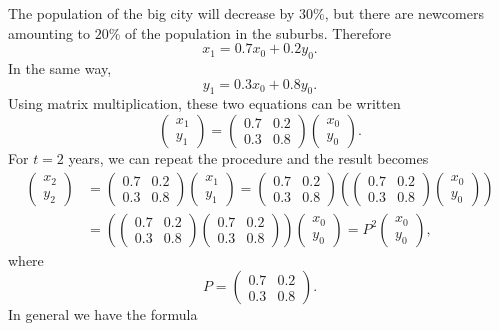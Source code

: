 \documentclass{article}
\begin{document}
\begin{example}
The population of the big city will decrease by $30\%$, but there are newcomers amounting to
$20\%$ of the population in the suburbs. Therefore
$$
x_1 = 0.7 x_0 + 0.2 y_0.
$$
In the same way,
$$
y_1 = 0.3 x_0 + 0.8 y_0.
$$
Using matrix multiplication, these two equations can be written
$$
\begin{pmatrix} x_1 \\ y_1 \end{pmatrix} = 
\begin{pmatrix} 
0.7 & 0.2\\
0.3 & 0.8
\end{pmatrix}
\begin{pmatrix} x_0 \\ y_0 \end{pmatrix}.
$$
For $t=2$ years, we can repeat the procedure and the result becomes
\begin{align}\label{snyd}
\begin{pmatrix} x_2 \\ y_2 \end{pmatrix} &= 
\begin{pmatrix} 
0.7 & 0.2\\
0.3 & 0.8
\end{pmatrix}
\begin{pmatrix} x_1 \\ y_1 \end{pmatrix} =
\begin{pmatrix} 
0.7 & 0.2\\
0.3 & 0.8
\end{pmatrix}
\left(\begin{pmatrix} 
0.7 & 0.2\\
0.3 & 0.8
\end{pmatrix}
\begin{pmatrix} x_0 \\ y_0 \end{pmatrix}\right)\\
&=
\left( 
\begin{pmatrix} 
0.7 & 0.2\\
0.3 & 0.8
\end{pmatrix}
\begin{pmatrix} 
0.7 & 0.2\\
0.3 & 0.8
\end{pmatrix}\right)
\begin{pmatrix} x_0 \\ y_0 \end{pmatrix} = 
P^2 \begin{pmatrix} x_0 \\ y_0 \end{pmatrix},
\end{align}
where 
\begin{equation}\label{stokmat}
P=\begin{pmatrix} 
0.7 & 0.2\\
0.3 & 0.8
\end{pmatrix}.
\end{equation}
In general we have the formula


\end{example}
\end{document}
